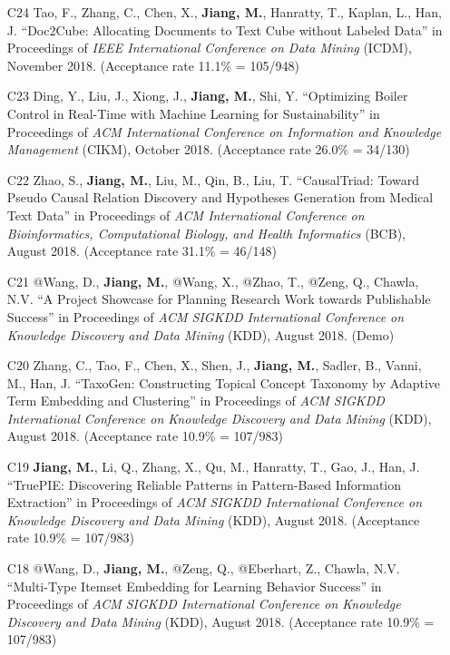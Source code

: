 \documentclass[10pt]{article}
\newenvironment{myindentpar}[1]%
{\begin{list}{}%
         {\setlength{\leftmargin}{#1}}%
         \item[]%
}
{\end{list}}
\newcounter{list}
\begin{document}
\begin{myindentpar}{0.00cm}
\begin{enumerate}[leftmargin=.5cm]
\item[C24] Tao, F., Zhang, C., Chen, X., \textbf{Jiang, M.}, Hanratty, T., Kaplan, L., Han, J. ``Doc2Cube: Allocating Documents to Text Cube without Labeled Data'' in Proceedings of \textit{IEEE International Conference on Data Mining} (ICDM), November 2018. (Acceptance rate 11.1\% = 105/948)

\item[C23] Ding, Y., Liu, J., Xiong, J., \textbf{Jiang, M.}, Shi, Y. ``Optimizing Boiler Control in Real-Time with Machine Learning for Sustainability'' in Proceedings of \textit{ACM International Conference on Information and Knowledge Management} (CIKM), October 2018. (Acceptance rate 26.0\% = 34/130)

\item[C22] Zhao, S., \textbf{Jiang, M.}, Liu, M., Qin, B., Liu, T. ``CausalTriad: Toward Pseudo Causal Relation Discovery and Hypotheses Generation from Medical Text Data'' in Proceedings of \textit{ACM International Conference on Bioinformatics, Computational Biology, and Health Informatics} (BCB), August 2018. (Acceptance rate 31.1\% = 46/148)

\item[C21] @Wang, D., \textbf{Jiang, M.}, @Wang, X., @Zhao, T., @Zeng, Q., Chawla, N.V. ``A Project Showcase for Planning Research Work towards Publishable Success'' in Proceedings of \textit{ACM SIGKDD International Conference on Knowledge Discovery and Data Mining} (KDD), August 2018. (Demo)

\item[C20] Zhang, C., Tao, F., Chen, X., Shen, J., \textbf{Jiang, M.}, Sadler, B., Vanni, M., Han, J. ``TaxoGen: Constructing Topical Concept Taxonomy by Adaptive Term Embedding and Clustering'' in Proceedings of \textit{ACM SIGKDD International Conference on Knowledge Discovery and Data Mining} (KDD), August 2018. (Acceptance rate 10.9\% = 107/983)

\item[C19] \textbf{Jiang, M.}, Li, Q., Zhang, X., Qu, M., Hanratty, T., Gao, J., Han, J. ``TruePIE: Discovering Reliable Patterns in Pattern-Based Information Extraction'' in Proceedings of \textit{ACM SIGKDD International Conference on Knowledge Discovery and Data Mining} (KDD), August 2018. (Acceptance rate 10.9\% = 107/983)
	
\item[C18] @Wang, D., \textbf{Jiang, M.}, @Zeng, Q., @Eberhart, Z., Chawla, N.V. ``Multi-Type Itemset Embedding for Learning Behavior Success'' in Proceedings of \textit{ACM SIGKDD International Conference on Knowledge Discovery and Data Mining} (KDD), August 2018. (Acceptance rate 10.9\% = 107/983)


\end{enumerate}
\end{myindentpar}
\end{document}
